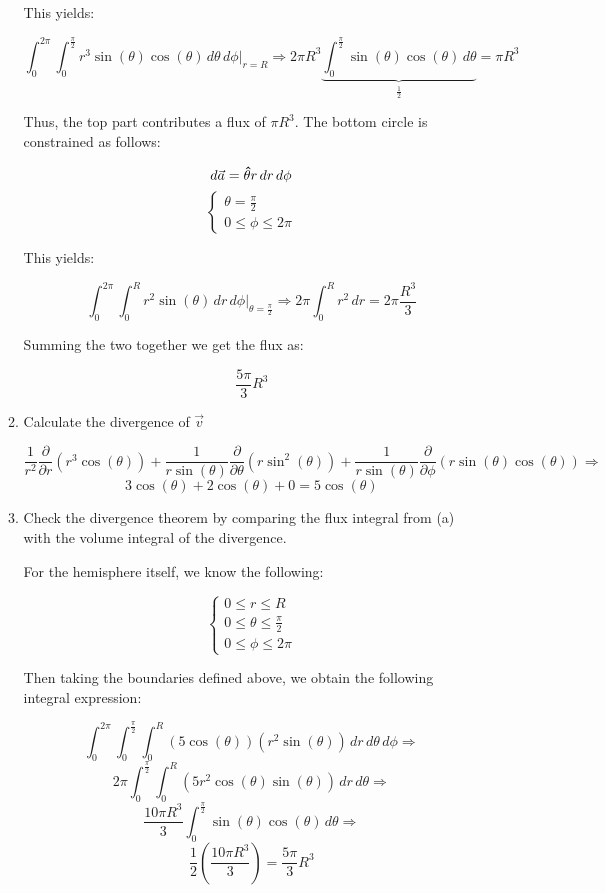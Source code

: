 \begin{enumerate}
\begin{enumerate}
          This yields:

          $$\int_0^{2\pi}\int_0^{\frac{\pi}{2}} r^3\sin(\theta)\cos(\theta)\,d\theta\,d\phi\Big|_{r=R}\Rightarrow2\pi R^3\underbrace{\int_0^{\frac{\pi}{2}} \sin(\theta)\cos(\theta)\,d\theta}_{\frac{1}{2}}=\pi R^3$$

          Thus, the top part contributes a flux of $\pi R^3$. The bottom circle is constrained as follows:

          $$d\vec{a}=\bold{\hat{\theta}}r\,dr\,d\phi$$
          $$\left\{\begin{array}{l} \theta = \frac{\pi}{2}\\ 0\leq \phi\leq 2\pi\end{array}$$

            This yields:

            $$\int_0^{2\pi}\int_0^R r^2\sin(\theta)\,dr\,d\phi\Big|_{\theta=\frac{\pi}{2}}\Rightarrow 2\pi\int_0^Rr^2\,dr=2\pi \frac{R^3}{3}$$

            Summing the two together we get the flux as:

            $$\boxed{\frac{5\pi}{3}R^3}$$

      \item Calculate the divergence of $\vec{v}$

        $$\frac{1}{r^2}\frac{\partial}{\partial r}(r^3\cos(\theta))+\frac{1}{r\sin(\theta)}\frac{\partial}{\partial \theta}(r\sin^2(\theta))+\frac{1}{r\sin(\theta)}\frac{\partial}{\partial \phi}(r\sin(\theta)\cos(\theta))\Rightarrow$$
        $$3\cos(\theta)+2\cos(\theta)+0=\boxed{5\cos(\theta)}$$

      \item Check the divergence theorem by comparing the flux integral from (a) with the volume integral of the divergence.

        For the hemisphere itself, we know the following:

        $$\left\{\begin{array}{l} 0\leq r\leq R\\0\leq\theta\leq \frac{\pi}{2}\\0\leq\phi\leq 2\pi\end{array}$$

        Then taking the boundaries defined above, we obtain the following integral expression:

        $$\int_0^{2\pi}\int_0^{\frac{\pi}{2}}\int_0^R(5\cos(\theta))(r^2\sin(\theta))\,dr\,d\theta\,d\phi\Rightarrow $$
        $$2\pi\int_0^{\frac{\pi}{2}}\int_0^R(5r^2\cos(\theta)\sin(\theta))\,dr\,d\theta\Rightarrow$$
        $$\frac{10\pi R^3}{3}\int_0^{\frac{\pi}{2}}\sin(\theta)\cos(\theta)\,d\theta\Rightarrow$$
        $$\frac{1}{2}\left( \frac{10\pi R^3}{3} \right)=\boxed{\frac{5\pi}{3}R^3}$$


\end{enumerate}
\end{enumerate}
